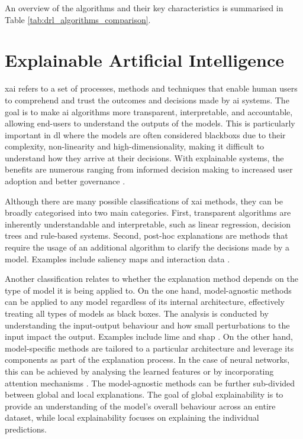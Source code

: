 An overview of the algorithms and their key characteristics is summarised in Table \ref{tab:drl_algorithms_comparison}. 



\section{Explainable Artificial Intelligence} \label{sec:explainableai}

\acrfull{xai} refers to a set of processes, methods and techniques that enable human users to comprehend and trust the outcomes and decisions made by \acrfull{ai} systems. The goal is to make \acrshort{ai} algorithms more transparent, interpretable, and accountable, allowing end-users to understand the outputs of the models. This is particularly important in \acrfull{dl} where the models are often considered \glspl{blackbox} due to their complexity, non-linearity and high-dimensionality, making it difficult to understand how they arrive at their decisions. With explainable systems, the benefits are numerous ranging from informed decision making to increased user adoption and better governance \cite{Phillips2021}. 

Although there are many possible classifications of \acrshort{xai} methods, they can be broadly categorised into two main categories. First, transparent algorithms are inherently understandable and interpretable, such as linear regression, decision trees and rule-based systems. Second, post-hoc explanations are methods that require the usage of an additional algorithm to clarify the decisions made by a model. Examples include saliency maps \cite{Sequeira2020} and interaction data \cite{Greydanus2018}. 

Another classification relates to whether the explanation method depends on the type of model it is being applied to. On the one hand, model-agnostic methods can be applied to any model regardless of its internal architecture, effectively treating all types of models as black boxes. The analysis is conducted by understanding the input-output behaviour and how small perturbations to the input impact the output. Examples include \acrfull{lime} \cite{Ribeiro2016} and \acrfull{shap} \cite{Lundberg2017}. On the other hand, model-specific methods are tailored to a particular architecture and leverage its components as part of the explanation process. In the case of neural networks, this can be achieved by analysing the learned features or by incorporating attention mechanisms \cite{Amirshahi2023}. The model-agnostic methods can be further sub-divided between global and local explanations. The goal of global explainability is to provide an understanding of the model's overall behaviour across an entire dataset, while local explainability focuses on explaining the individual predictions.

